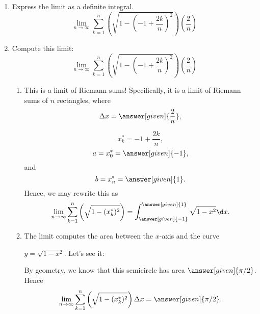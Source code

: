 \documentclass{ximera}
\begin{document}
\begin{example}
\begin{enumerate}


\item Express the limit as a definite integral.
 \[
  \lim_{n\to \infty} \sum_{k=1}^n \left(\sqrt{1-\left(-1+\frac{2k}{n}\right)^2}\right)
  \left(\frac{2}{n}\right)
  \]
  \item Compute this limit:
  \[
  \lim_{n\to \infty} \sum_{k=1}^n \left(\sqrt{1-\left(-1+\frac{2k}{n}\right)^2}\right)
  \left(\frac{2}{n}\right)
  \]

  \begin{explanation}
  \begin{enumerate}
  \item  This is a limit of Riemann sums!  Specifically, it is a limit of
    Riemann sums of $n$ rectangles, where
    \[
    \Delta x = \answer[given]{\frac{2}{n}},
    \]
 
    \[
    x_k^* = -1+\frac{2k}{n},
    \]
    \[
   a= x_0^* = \answer[given]{-1},
    \]
    and
     \[
    b=x_n^* = \answer[given]{1}.
    \]
    Hence, we may rewrite this as
    \[
    \lim_{n\to \infty} \sum_{k=1}^n \left(\sqrt{1-(x_k^*)^2}\right)=\int_{\answer[given]{-1}}^{\answer[given]{1}}\sqrt{1-x^2}
    \d x.
    \]
  \item The limit  computes the area between the $x$-axis and
    the curve
    
     $y = \sqrt{1-x^2}$. Let's see it:
    \begin{image}
    \end{image}
    By geometry, we know that this semicircle has area $\answer[given]{\pi/2}$. Hence
    \[
    \lim_{n\to \infty} \sum_{k=1}^n \left(\sqrt{1-(x_k^*)^2}\right)\Delta x =\answer[given]{\pi/2}.
    \]
     \end{enumerate}
  \end{explanation}
  \end{enumerate}
\end{example}
\end{document}
